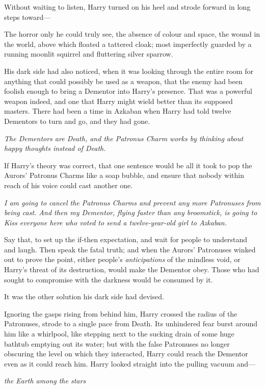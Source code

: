 Without waiting to listen, Harry turned on his heel and strode forward
in long steps toward---

The horror only he could truly see, the absence of colour and space, the
wound in the world, above which floated a tattered cloak; most
imperfectly guarded by a running moonlit squirrel and fluttering silver
sparrow.

His dark side had also noticed, when it was looking through the entire
room for anything that could possibly be used as a weapon, that the
enemy had been foolish enough to bring a Dementor into Harry's presence.
That was a powerful weapon indeed, and one that Harry might wield better
than its supposed masters. There had been a time in Azkaban when Harry
had told twelve Dementors to turn and go, and they had gone.

\emph{The Dementors are Death, and the Patronus Charm works by thinking
about happy thoughts instead of Death.}

If Harry's theory was correct, that one sentence would be all it took to
pop the Aurors' Patronus Charms like a soap bubble, and ensure that
nobody within reach of his voice could cast another one.

\emph{I am going to cancel the Patronus Charms and prevent any more
Patronuses from being cast. And then my Dementor, flying faster than any
broomstick, is going to Kiss everyone here who voted to send a
twelve-year-old girl to Azkaban.}

Say that, to set up the if-then expectation, and wait for people to
understand and laugh. Then speak the fatal truth; and when the Aurors'
Patronuses winked out to prove the point, either people's
\emph{anticipations} of the mindless void, or Harry's threat of its
destruction, would make the Dementor obey. Those who had sought to
compromise with the darkness would be consumed by it.

It was the other solution his dark side had devised.

Ignoring the gasps rising from behind him, Harry crossed the radius of
the Patronuses, strode to a single pace from Death. Its unhindered fear
burst around him like a whirlpool, like stepping next to the sucking
drain of some huge bathtub emptying out its water; but with the false
Patronuses no longer obscuring the level on which they interacted, Harry
could reach the Dementor even as it could reach him. Harry looked
straight into the pulling vacuum and---

\emph{the Earth among the stars}


